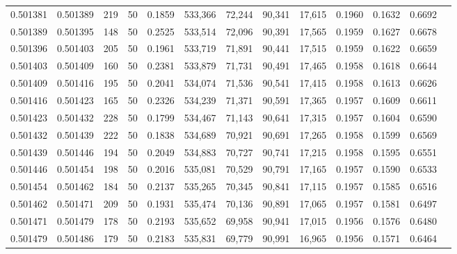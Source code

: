 \begin{tabular}{rrrrrrrrrrrrr}
0.501381 & 0.501389 & 219 &  50 &                                     0.1859 & 533,366 &  72,244 &  90,341 &  17,615 & 0.1960 & 0.1632 & 0.6692 \\
0.501389 & 0.501395 & 148 &  50 &                                     0.2525 & 533,514 &  72,096 &  90,391 &  17,565 & 0.1959 & 0.1627 & 0.6678 \\
0.501396 & 0.501403 & 205 &  50 &                                     0.1961 & 533,719 &  71,891 &  90,441 &  17,515 & 0.1959 & 0.1622 & 0.6659 \\
0.501403 & 0.501409 & 160 &  50 &                                     0.2381 & 533,879 &  71,731 &  90,491 &  17,465 & 0.1958 & 0.1618 & 0.6644 \\
0.501409 & 0.501416 & 195 &  50 &                                     0.2041 & 534,074 &  71,536 &  90,541 &  17,415 & 0.1958 & 0.1613 & 0.6626 \\
0.501416 & 0.501423 & 165 &  50 &                                     0.2326 & 534,239 &  71,371 &  90,591 &  17,365 & 0.1957 & 0.1609 & 0.6611 \\
0.501423 & 0.501432 & 228 &  50 &                                     0.1799 & 534,467 &  71,143 &  90,641 &  17,315 & 0.1957 & 0.1604 & 0.6590 \\
0.501432 & 0.501439 & 222 &  50 &                                     0.1838 & 534,689 &  70,921 &  90,691 &  17,265 & 0.1958 & 0.1599 & 0.6569 \\
0.501439 & 0.501446 & 194 &  50 &                                     0.2049 & 534,883 &  70,727 &  90,741 &  17,215 & 0.1958 & 0.1595 & 0.6551 \\
0.501446 & 0.501454 & 198 &  50 &                                     0.2016 & 535,081 &  70,529 &  90,791 &  17,165 & 0.1957 & 0.1590 & 0.6533 \\
0.501454 & 0.501462 & 184 &  50 &                                     0.2137 & 535,265 &  70,345 &  90,841 &  17,115 & 0.1957 & 0.1585 & 0.6516 \\
0.501462 & 0.501471 & 209 &  50 &                                     0.1931 & 535,474 &  70,136 &  90,891 &  17,065 & 0.1957 & 0.1581 & 0.6497 \\
0.501471 & 0.501479 & 178 &  50 &                                     0.2193 & 535,652 &  69,958 &  90,941 &  17,015 & 0.1956 & 0.1576 & 0.6480 \\
0.501479 & 0.501486 & 179 &  50 &                                     0.2183 & 535,831 &  69,779 &  90,991 &  16,965 & 0.1956 & 0.1571 & 0.6464 \\

\end{tabular}
